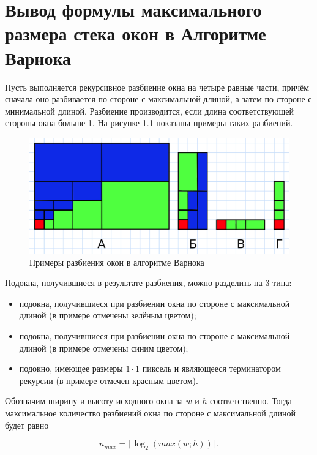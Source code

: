 \chapter{Вывод формулы максимального размера стека окон в Алгоритме Варнока}
\label{cha:appendix2}

Пусть выполняется рекурсивное разбиение окна на четыре равные части, причём сначала оно разбивается по стороне с максимальной длиной, а затем по стороне с минимальной длиной. Разбиение производится, если длина соответствующей стороны окна больше 1. На рисунке \ref{fig:subdivide_2} показаны примеры таких разбиений.

\begin{figure}[h]
	\centering
	\includegraphics[width=\textwidth ]{img/subdivide_2.png}
	\caption{Примеры разбиения окон в алгоритме Варнока}
	\label{fig:subdivide_2}
\end{figure} 

Подокна, получившиеся в результате разбиения, можно разделить на 3 типа: 

\begin{itemize}
	\item подокна, получившиеся при разбиении окна по стороне с максимальной длиной (в примере отмечены зелёным цветом);
	\item подокна, получившиеся при разбиении окна по стороне с максимальной длиной (в примере отмечены синим цветом);
	\item подокно, имеющее размеры $1\cdot1$ пиксель и являющееся терминатором рекурсии (в примере отмечен красным цветом).
\end{itemize}

Обозначим ширину и высоту исходного окна за $w$ и $h$ соответственно. Тогда максимальное количество разбиений окна по стороне с максимальной длиной будет равно

\begin{equation}
	\label{eq:n_max}
	n_{max} = \lceil\log_{2} (max(w; h))\rceil.
\end{equation}

